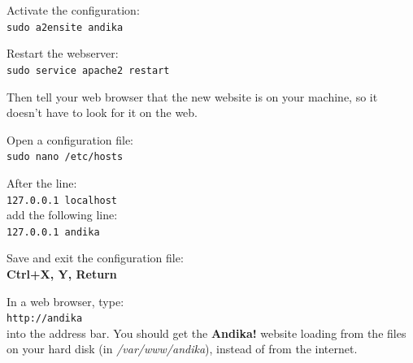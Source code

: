 Activate the configuration:\\
\verb|sudo a2ensite andika|

Restart the webserver:\\
\verb|sudo service apache2 restart|

Then tell your web browser that the new website is on your machine, so it doesn't have to look for it on the web.

Open a configuration file:\\
\verb|sudo nano /etc/hosts|

After the line:\\
\verb|127.0.0.1	localhost|\\
add the following line:\\
\verb|127.0.0.1	andika|

Save and exit the configuration file:\\
\textbf{Ctrl+X, Y, Return}

In a web browser, type:\\
\verb|http://andika|\\
into the address bar.  You should get the \textbf{Andika!} website loading from the files on your hard disk (in \textit{/var/www/andika}), instead of from the internet.
